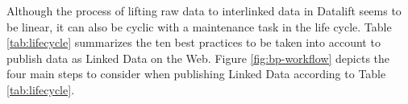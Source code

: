 \begin{figure}
\end{figure}

Although the process of lifting raw data to interlinked data in Datalift seems to be linear, it can also be cyclic with a maintenance task in the life cycle. Table \ref{tab:lifecycle} summarizes the ten best practices to be taken into account to publish data as Linked Data on the Web. Figure \ref{fig:bp-workflow} depicts the four main steps to consider when publishing Linked Data according to Table \ref{tab:lifecycle}.


